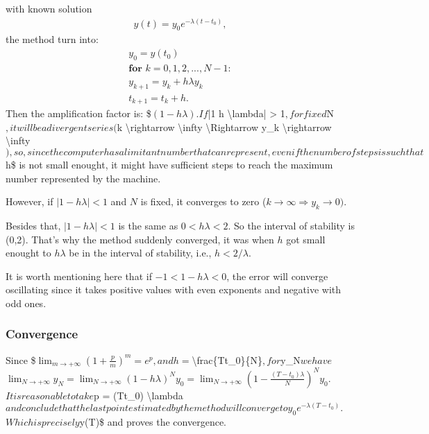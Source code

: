 \documentclass[letterpaper,10pt,english]{jupyterBook}
\begin{document}
\sphinxAtStartPar
with known solution
\begin{equation*}
\begin{split} y(t) = y_0e^{-\lambda (t-t_0)},\end{split}
\end{equation*}
\sphinxAtStartPar
the method turn into:
\begin{equation*}
\begin{split}
y_0 = y(t_0)\\
\textbf{for } k = 0, 1, 2, ..., N-1 :\\
    y_{k+1} = y_k + h \lambda y_k \\
    t_{k+1} = t_k + h.
\end{split}
\end{equation*}
\sphinxAtStartPar
Then the amplification factor is:
\$\(
(1 - h \lambda).
\)\(
If \)|1 \sphinxhyphen{} h \textbackslash{}lambda| > 1\(, for fixed \)N\(, it will be a divergent series (\)k \textbackslash{}rightarrow \textbackslash{}infty \textbackslash{}Rightarrow y\_k \textbackslash{}rightarrow \textbackslash{}infty \(), so, since the computer has a limitant number that can represent, even if the number of steps is such that \)h\$ is not small enought, it might have sufficient steps to reach the maximum number represented by the machine.

\sphinxAtStartPar
However, if \(|1 - h \lambda| < 1\) and \(N\) is fixed, it converges to zero (\(k \rightarrow \infty \Rightarrow y_k \rightarrow 0 )\).

\sphinxAtStartPar
Besides that, \(|1 - h \lambda| < 1\) is the same as \(0 < h \lambda < 2\).
So the interval of stability is (0,2).
That’s why the method suddenly converged, it was when \(h\) got small enought to \(h \lambda\) be in the interval of stability, i.e., \(h < 2/\lambda\).

\sphinxAtStartPar
It is worth mentioning here that if \(-1 < 1 - h \lambda < 0\), the error will converge oscillating since it takes positive values with even exponents and negative with odd ones.


\subsubsection{Convergence}
\label{\detokenize{cap2:convergence}}
\sphinxAtStartPar
Since
\$\(
\lim_{m \to +\infty} \left(1 + \frac{p}{m} \right)^m = e^p,
\)\(
and h = \)\textbackslash{}frac\{T\sphinxhyphen{}t\_0\}\{N\}\(, for \)y\_N\( we have
\)\(
\lim_{N \to +\infty} y_N = \lim_{N \to +\infty} \left(1 - h \lambda \right)^N y_0 = \lim_{N \to +\infty} \left(1 - \frac{(T-t_0) \lambda}{N} \right)^N y_0.
\)\(
It is reasonable to take \)p = \sphinxhyphen{}(T\sphinxhyphen{}t\_0) \textbackslash{}lambda\( and conclude that the last point estimated by the method will converge to
\)\(
y_0e^{-\lambda (T-t_0)}.
\)\(
Which is precisely \)y(T)\$ and proves the convergence.
\end{document}
